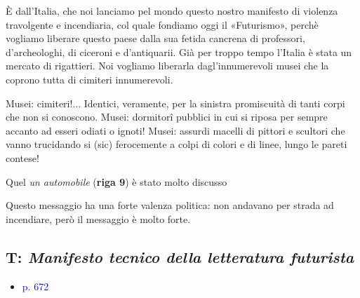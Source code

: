 \documentclass[a4paper, twoside, titlepage]{book}
\newcommand{\elenco}[1]{%
\begin{itemize}
#1
\end{itemize}}
\renewcommand{\emph}[1]{\textcolor{blue}{#1}}
\begin{document}
{È dall'Italia, che noi lanciamo pel mondo questo nostro manifesto di violenza travolgente e incendiaria, col quale fondiamo oggi il «Futurismo», perchè vogliamo liberare questo paese dalla sua fetida cancrena di professori, d'archeologhi, di ciceroni e d'antiquarii. Già per troppo tempo l’Italia è stata un mercato di rigattieri. Noi vogliamo liberarla dagl’innumerevoli musei che la coprono tutta di cimiteri innumerevoli.

Musei: cimiteri!... Identici, veramente, per la sinistra promiscuità di tanti corpi che non si conoscono. Musei: dormitorî pubblici in cui si riposa per sempre accanto ad esseri odiati o ignoti! Musei: assurdi macelli di pittori e scultori che vanno trucidando si (sic) ferocemente a colpi di colori e di linee, lungo le pareti contese!}

Quel \textit{un automobile} (\textbf{riga 9}) è stato molto discusso

Questo messaggio ha una forte valenza politica: non andavano per strada ad incendiare, però il messaggio è molto forte.


\subsection{T: \textit{Manifesto tecnico della letteratura futurista}}
\elenco{\item \emph{p. 672}}
\end{document}
